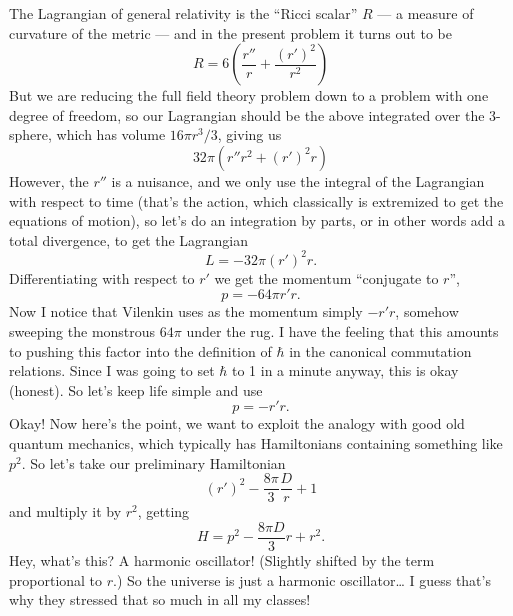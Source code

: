 \documentclass[12pt]{article}
\begin{document}
The Lagrangian of general relativity is the ``Ricci scalar'' \(R\) --- a
measure of curvature of the metric --- and in the present problem it
turns out to be
\[R = 6 \left(\frac{r''}{r} + \frac{(r')^2}{r^2}\right)\] But we are
reducing the full field theory problem down to a problem with one degree
of freedom, so our Lagrangian should be the above integrated over the
3-sphere, which has volume \(16 \pi r^3/3\), giving us
\[32\pi (r''r^2 + (r')^2 r)\] However, the \(r''\) is a nuisance, and we
only use the integral of the Lagrangian with respect to time (that's the
action, which classically is extremized to get the equations of motion),
so let's do an integration by parts, or in other words add a total
divergence, to get the Lagrangian \[L = -32\pi (r')^2 r.\]
Differentiating with respect to \(r'\) we get the momentum ``conjugate
to \(r\)'', \[p = -64\pi r'r.\] Now I notice that Vilenkin uses as the
momentum simply \(-r'r\), somehow sweeping the monstrous \(64\pi\) under
the rug. I have the feeling that this amounts to pushing this factor
into the definition of \(\hbar\) in the canonical commutation relations.
Since I was going to set \(\hbar\) to 1 in a minute anyway, this is okay
(honest). So let's keep life simple and use \[p = -r'r.\] Okay! Now
here's the point, we want to exploit the analogy with good old quantum
mechanics, which typically has Hamiltonians containing something like
\(p^2\). So let's take our preliminary Hamiltonian
\[(r')^2-\frac{8\pi}{3} \frac{D}{r} + 1\] and multiply it by \(r^2\),
getting \[H = p^2-\frac{8\pi D}{3}r + r^2.\] Hey, what's this? A
harmonic oscillator! (Slightly shifted by the term proportional to
\(r\).) So the universe is just a harmonic oscillator\ldots{} I guess
that's why they stressed that so much in all my classes!
\end{document}
